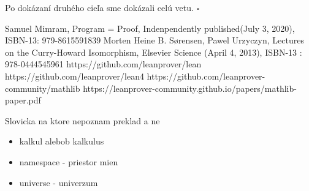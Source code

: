 \documentclass[a4paper,10pt,oneside]{report}%
\begin{document}
Po dokázaní druhého cieľa sme dokázali celú vetu. $\square$

\begin{thebibliography}{xx}
     Samuel Mimram, Program = Proof, Indenpendently published(July 3, 2020), ISBN-13: 979-8615591839
     Morten Heine B. Sørensen, Pawel Urzyczyn, Lectures on the Curry-Howard Isomorphism,
        Elsevier Science (April 4, 2013),  ISBN-13 : 978-0444545961
     https://github.com/leanprover/lean
     https://github.com/leanprover/lean4
     https://github.com/leanprover-community/mathlib
     https://leanprover-community.github.io/papers/mathlib-paper.pdf
\end{thebibliography}

Slovicka na ktore nepoznam preklad a ne
\begin{itemize}
    \item kalkul alebob kalkulus
    \item namespace - priestor mien
    \item universe - univerzum
\end{itemize}
\end{document}
